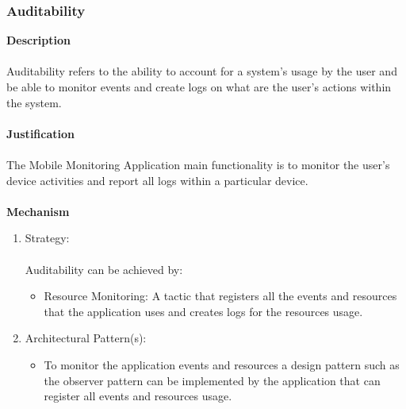 \documentclass[hidelinks, 12pt, oneside]{article}
\begin{document}
			\subsubsection*{Auditability}
			\textbf{Description} \\\\
			Auditability refers to the ability to account for a system's usage by the user and be able to monitor events and create logs on what are the user's actions within the system.\\\\
			\textbf{Justification}\\\\
			The Mobile Monitoring Application main functionality is to monitor the user's device activities and report all logs within a particular device.\\\\
			\textbf{Mechanism}
				\begin{enumerate}
					\item Strategy: \\\\
						Auditability can be achieved by:
						\begin{itemize}
							\item Resource Monitoring: A tactic that registers all the events and resources that the application uses and creates logs for the resources usage.  
						\end{itemize}
					\item Architectural Pattern(s):
						\begin{itemize}
							\item To monitor the application events and resources a design pattern such as the observer pattern can be implemented by the application that can register all events and resources usage. 
						\end{itemize}
				\end{enumerate}	
			\newpage
\end{document}
